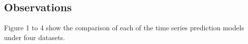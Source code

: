 \subsection{Observations}

Figure 1 to 4 show the comparison of each of the time series prediction models under four datasets.
